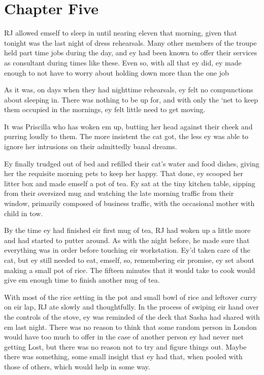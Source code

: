 \chapter*{Chapter Five}

RJ allowed emself to sleep in until nearing eleven that morning, given that tonight was the last night of dress rehearsals.  Many other members of the troupe held part time jobs during the day, and ey had been known to offer their services as consultant during times like these.  Even so, with all that ey did, ey made enough to not have to worry about holding down more than the one job

As it was, on days when they had nighttime rehearsals, ey felt no compunctions about sleeping in.  There was nothing to be up for, and with only the `net to keep them occupied in the mornings, ey felt little need to get moving.

It was Priscilla who has woken em up, butting her head against their cheek and purring loudly to them.  The more insistent the cat got, the less ey was able to ignore her intrusions on their admittedly banal dreams.

Ey finally trudged out of bed and refilled their cat's water and food dishes, giving her the requisite morning pets to keep her happy.  That done, ey scooped her litter box and made emself a pot of tea.  Ey sat at the tiny kitchen table, sipping from their oversized mug and watching the late morning traffic from their window, primarily composed of business traffic, with the occasional mother with child in tow.

By the time ey had finished eir first mug of tea, RJ had woken up a little more and had started to putter around.  As with the night before, he made sure that everything was in order before touching eir workstation.  Ey'd taken care of the cat, but ey still needed to eat, emself, so, remembering eir promise, ey set about making a small pot of rice.  The fifteen minutes that it would take to cook would give em enough time to finish another mug of tea.

With most of the rice setting in the pot and small bowl of rice and leftover curry on eir lap, RJ ate slowly and thoughtfully.  In the process of swiping eir hand over the controls of the stove, ey was reminded of the deck that Sasha had shared with em last night.  There was no reason to think that some random person in London would have too much to offer in the case of another person ey had never met getting Lost, but there was no reason not to try and figure things out.  Maybe there was something, some small insight that ey had that, when pooled with those of others, which would help in some way.

